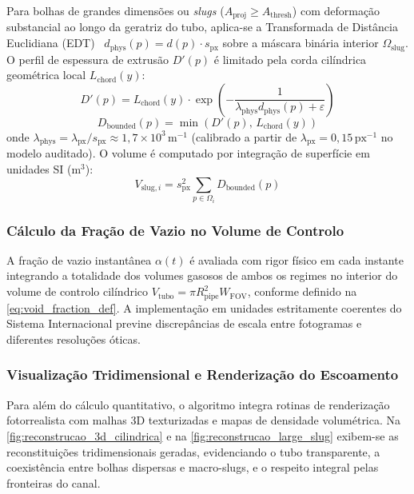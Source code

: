 Para bolhas de grandes dimensões ou \emph{slugs} ($A_{\text{proj}} \ge A_{\text{thresh}}$) com deformação substancial ao longo da geratriz do tubo, aplica-se a Transformada de Distância Euclidiana (EDT)~\cite{felzenszwalb2012distance} $d_{\text{phys}}(p) = d(p) \cdot s_{\text{px}}$ sobre a máscara binária interior $\Omega_{\text{slug}}$. O perfil de espessura de extrusão $D'(p)$ é limitado pela corda cilíndrica geométrica local $L_{\text{chord}}(y)$:
\begin{equation}
    D'(p) = L_{\text{chord}}(y) \cdot \exp\left(-\frac{1}{\lambda_{\text{phys}} d_{\text{phys}}(p) + \varepsilon}\right)
\end{equation}
\begin{equation}
    D_{\text{bounded}}(p) = \min\left(D'(p), \, L_{\text{chord}}(y)\right)
\end{equation}
onde $\lambda_{\text{phys}} = \lambda_{\text{px}} / s_{\text{px}} \approx 1{,}7 \times 10^3\,\mathrm{m}^{-1}$ (calibrado a partir de $\lambda_{\text{px}} = 0{,}15\,\mathrm{px}^{-1}$ no modelo auditado). O volume é computado por integração de superfície em unidades SI ($\mathrm{m}^3$):
\begin{equation}
    V_{\text{slug}, i} = s_{\text{px}}^2 \sum_{p \in \Omega_i} D_{\text{bounded}}(p)
\end{equation}

\subsubsection{Cálculo da Fração de Vazio no Volume de Controlo}
\label{subsubsec:void_fraction_calc}

A fração de vazio instantânea $\alpha(t)$ é avaliada com rigor físico em cada instante integrando a totalidade dos volumes gasosos de ambos os regimes no interior do volume de controlo cilíndrico $V_{\text{tubo}} = \pi R_{\text{pipe}}^2 W_{\text{FOV}}$, conforme definido na \autoref{eq:void_fraction_def}. A implementação em unidades estritamente coerentes do Sistema Internacional previne discrepâncias de escala entre fotogramas e diferentes resoluções óticas.

\subsubsection{Visualização Tridimensional e Renderização do Escoamento}
\label{subsubsec:visualizacao_3d}

Para além do cálculo quantitativo, o algoritmo integra rotinas de renderização fotorrealista com malhas 3D texturizadas e mapas de densidade volumétrica. Na \autoref{fig:reconstrucao_3d_cilindrica} e na \autoref{fig:reconstrucao_large_slug} exibem-se as reconstituições tridimensionais geradas, evidenciando o tubo transparente, a coexistência entre bolhas dispersas e macro-slugs, e o respeito integral pelas fronteiras do canal.

